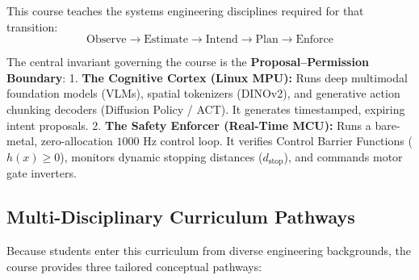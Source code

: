 \documentclass[
  9pt,
  letterpaper,
  open=right,
  numbers=noenddot,
  captions=tableheading]{scrbook}
\makeatletter
\newif\ifmlsys@inside@longtable
\newif\ifmlsys@longtable@numbered
\let\mlsys@orig@label\label
\renewcommand{\label}[1]{%
  \ifmlsys@inside@longtable
    \global\mlsys@longtable@numberedtrue
  \fi
  \mlsys@orig@label{#1}%
}
\let\label\mlsys@orig@label
\makeatother
\begin{document}
This course teaches the systems engineering disciplines required for
that transition:
\[\text{Observe} \longrightarrow \text{Estimate} \longrightarrow \text{Intend} \longrightarrow \text{Plan} \longrightarrow \text{Enforce}\]

The central invariant governing the course is the
\textbf{Proposal--Permission Boundary}: 1. \textbf{The Cognitive Cortex
(Linux MPU):} Runs deep multimodal foundation models (VLMs), spatial
tokenizers (DINOv2), and generative action chunking decoders (Diffusion
Policy / ACT). It generates timestamped, expiring intent proposals. 2.
\textbf{The Safety Enforcer (Real-Time MCU):} Runs a bare-metal,
zero-allocation \(1000\text{ Hz}\) control loop. It verifies Control
Barrier Functions (\(h(x) \ge 0\)), monitors dynamic stopping distances
(\(d_{\text{stop}}\)), and commands motor gate inverters.

\subsection*{Multi-Disciplinary Curriculum
Pathways}\label{multi-disciplinary-curriculum-pathways}

Because students enter this curriculum from diverse engineering
backgrounds, the course provides three tailored conceptual pathways:
\end{document}
